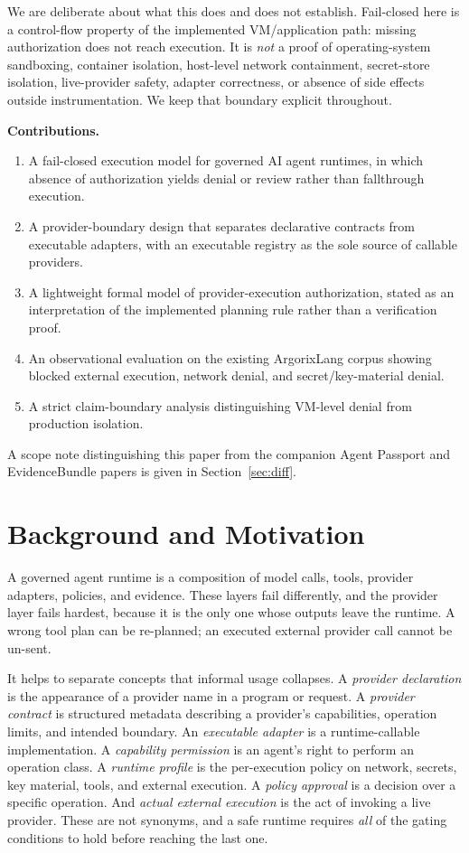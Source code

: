 \documentclass[conference]{IEEEtran}
\newcommand{\Argorix}{%
\textcolor{argViolet}{A}\textcolor{argViolet}{r}\textcolor{argIndigo}{g}\textcolor{argIndigo}{o}\textcolor{argElectric}{r}\textcolor{argElectric}{i}\textcolor{argElectric}{x}\textcolor{argCyan}{L}\textcolor{argCyan}{a}\textcolor{argCyanBright}{n}\textcolor{argCyanBright}{g}\xspace}
\begin{document}
We are deliberate about what this does and does not establish. Fail-closed here is a
control-flow property of the implemented VM/application path: missing authorization does
not reach execution. It is \emph{not} a proof of operating-system sandboxing, container
isolation, host-level network containment, secret-store isolation, live-provider safety,
adapter correctness, or absence of side effects outside instrumentation. We keep that
boundary explicit throughout.

\noindent\textbf{Contributions.}
\begin{enumerate}
\item A fail-closed execution model for governed AI agent runtimes, in which absence of
authorization yields denial or review rather than fallthrough execution.
\item A provider-boundary design that separates declarative contracts from executable
adapters, with an executable registry as the sole source of callable providers.
\item A lightweight formal model of provider-execution authorization, stated as an
interpretation of the implemented planning rule rather than a verification proof.
\item An observational evaluation on the existing \Argorix corpus showing blocked external
execution, network denial, and secret/key-material denial.
\item A strict claim-boundary analysis distinguishing VM-level denial from production
isolation.
\end{enumerate}

A scope note distinguishing this paper from the companion Agent Passport and
EvidenceBundle papers is given in Section~\ref{sec:diff}.

\section{Background and Motivation}\label{sec:background}
A governed agent runtime is a composition of model calls, tools, provider adapters,
policies, and evidence. These layers fail differently, and the provider layer fails
hardest, because it is the only one whose outputs leave the runtime. A wrong tool plan can
be re-planned; an executed external provider call cannot be un-sent.

It helps to separate concepts that informal usage collapses. A \emph{provider declaration}
is the appearance of a provider name in a program or request. A \emph{provider contract} is
structured metadata describing a provider's capabilities, operation limits, and intended
boundary. An \emph{executable adapter} is a runtime-callable implementation. A
\emph{capability permission} is an agent's right to perform an operation class. A
\emph{runtime profile} is the per-execution policy on network, secrets, key material,
tools, and external execution. A \emph{policy approval} is a decision over a specific
operation. And \emph{actual external execution} is the act of invoking a live provider.
These are not synonyms, and a safe runtime requires \emph{all} of the gating conditions to
hold before reaching the last one.
\end{document}
